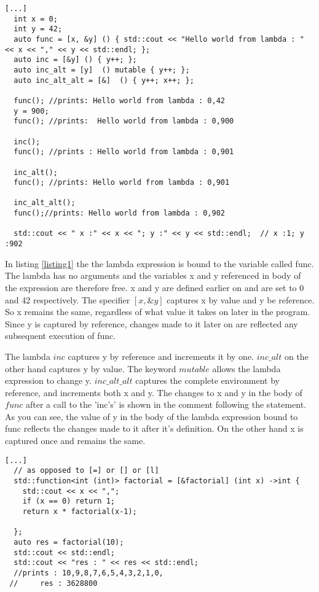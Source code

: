 \documentclass[12pt,fleqn]{article}
\begin{document}
\begin{lstlisting}[caption=various ways lambda's capture the environment , label=listing1]
[...]
  int x = 0;
  int y = 42;
  auto func = [x, &y] () { std::cout << "Hello world from lambda : " << x << "," << y << std::endl; };
  auto inc = [&y] () { y++; };
  auto inc_alt = [y]  () mutable { y++; };
  auto inc_alt_alt = [&]  () { y++; x++; };

  func(); //prints: Hello world from lambda : 0,42
  y = 900;
  func(); //prints:  Hello world from lambda : 0,900

  inc();
  func(); //prints : Hello world from lambda : 0,901

  inc_alt();
  func(); //prints: Hello world from lambda : 0,901

  inc_alt_alt(); 
  func();//prints: Hello world from lambda : 0,902

  std::cout << " x :" << x << "; y :" << y << std::endl;  // x :1; y :902

\end{lstlisting}
In listing \ref{listing1} the the lambda expression is bound to the variable called func. 
The lambda has no arguments and the variables  x and y referenced in body of the expression are therefore free. 
x and y are defined earlier on and are set to 0 and 42 respectively. 
The specifier $[x,\&y]$ captures x by value and y be reference.
So  x remains the same, regardless of what value it takes on later in the program. 
Since y is captured by reference, changes made to it later on are reflected any subsequent execution of func.

The lambda $inc$ captures y by reference and increments it by one.
$inc\_alt$ on the other hand captures y by value. 
The keyword $mutable$ allows the lambda expression to change y.
$inc\_alt\_alt$ captures the complete environment by reference, and increments both x and y.
The changes to x and y in the body of $func$ after a call to the 'inc's' is shown in the comment following the statement.
As you can see, the value of y in the body of the lambda expression bound to func reflects the changes made to it after it's definition. 
On the other hand x is captured once and remains the same.

\begin{lstlisting}[caption=implementation of factorial using lambda recursion, label=lr]
[...]
  // as opposed to [=] or [] or [l]
  std::function<int (int)> factorial = [&factorial] (int x) ->int {
    std::cout << x << ",";
    if (x == 0) return 1;
    return x * factorial(x-1);
    
  };
  auto res = factorial(10);
  std::cout << std::endl;
  std::cout << "res : " << res << std::endl;
  //prints : 10,9,8,7,6,5,4,3,2,1,0,
 //     res : 3628800
\end{lstlisting}
\end{document}
